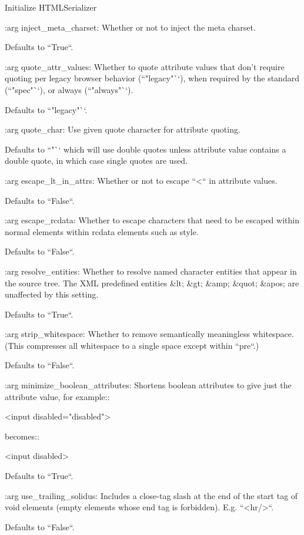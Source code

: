 \begin{DoxyVerb}Initialize HTMLSerializer

:arg inject_meta_charset: Whether or not to inject the meta charset.

    Defaults to ``True``.

:arg quote_attr_values: Whether to quote attribute values that don't
    require quoting per legacy browser behavior (``"legacy"``), when
    required by the standard (``"spec"``), or always (``"always"``).

    Defaults to ``"legacy"``.

:arg quote_char: Use given quote character for attribute quoting.

    Defaults to ``"`` which will use double quotes unless attribute
    value contains a double quote, in which case single quotes are
    used.

:arg escape_lt_in_attrs: Whether or not to escape ``<`` in attribute
    values.

    Defaults to ``False``.

:arg escape_rcdata: Whether to escape characters that need to be
    escaped within normal elements within rcdata elements such as
    style.

    Defaults to ``False``.

:arg resolve_entities: Whether to resolve named character entities that
    appear in the source tree. The XML predefined entities &lt; &gt;
    &amp; &quot; &apos; are unaffected by this setting.

    Defaults to ``True``.

:arg strip_whitespace: Whether to remove semantically meaningless
    whitespace. (This compresses all whitespace to a single space
    except within ``pre``.)

    Defaults to ``False``.

:arg minimize_boolean_attributes: Shortens boolean attributes to give
    just the attribute value, for example::

      <input disabled="disabled">

    becomes::

      <input disabled>

    Defaults to ``True``.

:arg use_trailing_solidus: Includes a close-tag slash at the end of the
    start tag of void elements (empty elements whose end tag is
    forbidden). E.g. ``<hr/>``.

    Defaults to ``False``.


\end{DoxyVerb}
